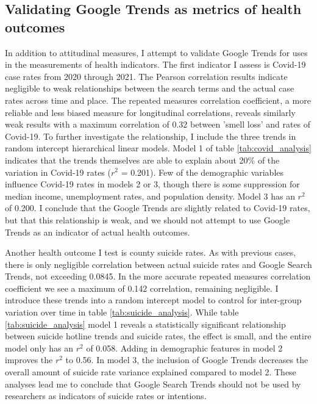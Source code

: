 

\subsection{Validating Google Trends as metrics of health outcomes}

In addition to attitudinal measures, I attempt to validate Google Trends for
uses in the measurements of health indicators. The first indicator I assess is
Covid-19 case rates from 2020 through 2021. The Pearson correlation results
indicate negligible to weak relationships between the search terms and the
actual case rates across time and place. The repeated measures correlation
coefficient, a more reliable and less biased measure for longitudinal
correlations, reveals similarly weak results with a maximum correlation of 0.32
between 'smell loss' and rates of Covid-19. To further investigate the relationship, I
include the three trends in random intercept hierarchical linear models. Model 1
of table \ref{tab:covid_analysis} indicates that the trends themselves are able
to explain about 20\% of the variation in Covid-19 rates ($r^2$ = 0.201). Few
of the demographic variables influence Covid-19 rates in models 2 or 3,
though there is some suppression for median income, unemployment rates,
and population density. Model 3 has an $r^2$ of 0.200. I conclude that the
Google Trends are slightly related to Covid-19 rates, but that this relationship
is weak, and we should not attempt to use Google Trends as an indicator of actual
health outcomes.



Another health outcome I test is county suicide rates. As with previous cases,
there is only negligible correlation between actual suicide rates and Google
Search Trends, not exceeding 0.0845. In the more accurate repeated measures
correlation coefficient we see a maximum of 0.142 correlation, remaining
negligible. I introduce these trends into a random intercept model to control
for inter-group variation over time in table \ref{tab:suicide_analysis}. While
table \ref{tab:suicide_analysis} model 1 reveals a statistically significant relationship
between suicide hotline trends and suicide rates, the effect is small, and the
entire model only has an $r^2$ of 0.058. Adding in demographic features in model
2 improves the $r^2$ to 0.56. In model 3, the inclusion of Google Trends
decreases the overall amount of suicide rate variance explained
compared to model 2. These analyses lead me to conclude that Google Search
Trends should not be used by researchers as indicators of suicide rates or intentions.

